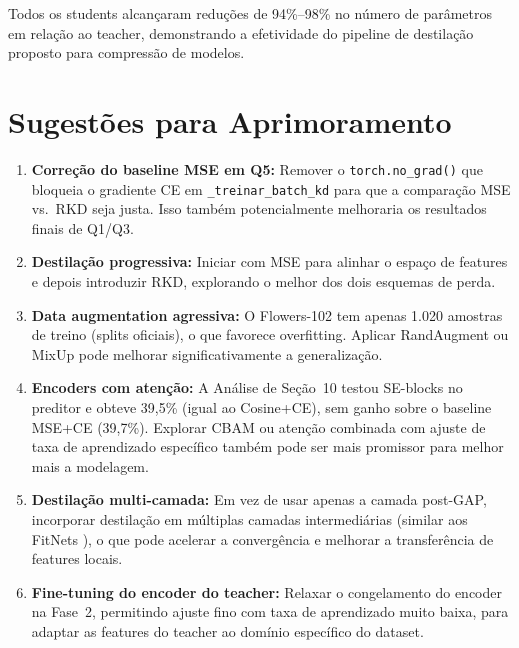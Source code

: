 \documentclass[
  article,            %
  11pt,               %
  letterpaper,        %
  oneside,            %
  sumario = tradicional
]{abntex2}
\begin{document}
Todos os students alcançaram reduções de 94\%--98\% no número de parâmetros
em relação ao teacher, demonstrando a efetividade do pipeline de destilação
proposto para compressão de modelos.

\section{Sugestões para Aprimoramento}

\begin{enumerate}
  \item \textbf{Correção do baseline MSE em Q5:} Remover o \texttt{torch.no\_grad()}
    que bloqueia o gradiente CE em \texttt{\_treinar\_batch\_kd} para que a
    comparação MSE vs.\ RKD seja justa. Isso também potencialmente melhoraria
    os resultados finais de Q1/Q3.

  \item \textbf{Destilação progressiva:} Iniciar com MSE para
    alinhar o espaço de features e depois introduzir RKD, explorando o melhor
    dos dois esquemas de perda.

  \item \textbf{Data augmentation agressiva:} O Flowers-102 tem apenas 1.020
    amostras de treino (splits oficiais), o que favorece overfitting. Aplicar
    RandAugment ou MixUp pode melhorar significativamente a generalização.

  \item \textbf{Encoders com atenção:} A Análise de Seção~10 testou SE-blocks
    \cite{hu2018squeeze} no preditor e obteve 39,5\% (igual ao Cosine+CE),
    sem ganho sobre o baseline MSE+CE (39,7\%). Explorar CBAM ou atenção
    combinada com ajuste de taxa de aprendizado específico também pode ser mais
    promissor para melhor mais a modelagem.

  \item \textbf{Destilação multi-camada:} Em vez de usar apenas a camada
    post-GAP, incorporar destilação em múltiplas camadas intermediárias
    (similar aos FitNets \cite{romero2015fitnets}), o que pode acelerar a
    convergência e melhorar a transferência de features locais.

  \item \textbf{Fine-tuning do encoder do teacher:} Relaxar o congelamento do
    encoder na Fase~2, permitindo ajuste fino com taxa de aprendizado muito
    baixa, para adaptar as features do teacher ao domínio específico do dataset.
\end{enumerate}

\newpage
\printbibliography
\end{document}
